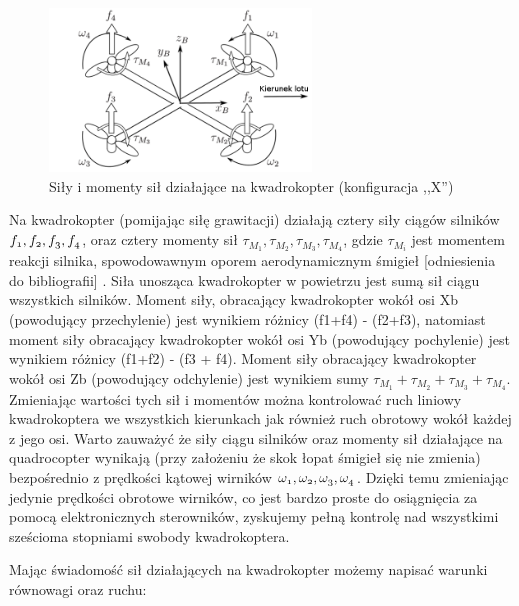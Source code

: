 \begin{figure}[H]
	\centering
		\includegraphics[width=0.62\textwidth]{Pictures/quadrotor_forces.png}
		\caption[Siły i momenty sił działające na kwadrokopter]{Siły i momenty sił działające na kwadrokopter (konfiguracja ,,X'')}
	\label{fig:quadrotor_forces}
\end{figure}


Na kwadrokopter (pomijając siłę grawitacji) działają cztery siły ciągów silników $\mathnormal{f_1, f_2, f_3, f_4}$, oraz cztery momenty sił $\tau_{M_1}, \tau_{M_2}, \tau_{M_3}, \tau_{M_4}$, gdzie $\tau_{M_i}$ jest momentem reakcji silnika, spowodowawnym oporem aerodynamicznym śmigieł [odniesienia do bibliografii] . 
Siła unosząca kwadrokopter w powietrzu jest sumą sił ciągu wszystkich silników. Moment siły, obracający kwadrokopter wokół osi Xb (powodujący przechylenie) jest wynikiem różnicy (f1+f4) - (f2+f3), natomiast moment siły obracający kwadrokopter wokół osi Yb (powodujący pochylenie) jest wynikiem różnicy (f1+f2) - (f3 + f4). 
Moment siły obracający kwadrokopter wokół osi Zb (powodujący odchylenie) jest wynikiem sumy $\tau_{M_1} + \tau_{M_2} + \tau_{M_3} + \tau_{M_4}$.  Zmieniając wartości tych sił i momentów można kontrolować ruch liniowy kwadrokoptera we wszystkich kierunkach jak również ruch obrotowy wokół każdej z jego osi. Warto zauważyć że siły ciągu silników oraz momenty sił działające na quadrocopter wynikają (przy założeniu że skok łopat śmigieł się nie zmienia) bezpośrednio z prędkości kątowej wirników $\mathnormal{\omega_1, \omega_2, \omega_3, \omega_4}$. Dzięki temu zmieniając jedynie prędkości obrotowe wirników, co jest bardzo proste do osiągnięcia za pomocą elektronicznych sterowników, zyskujemy pełną kontrolę nad wszystkimi sześcioma stopniami swobody kwadrokoptera.  

Mając świadomość sił działających na kwadrokopter możemy napisać warunki równowagi oraz ruchu:

